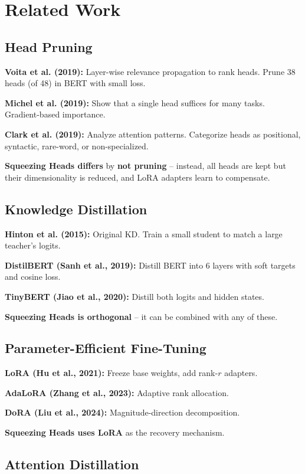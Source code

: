 
\section{Related Work}

\subsection{Head Pruning}

\textbf{Voita et al. (2019):} Layer-wise relevance propagation to rank heads. 
Prune 38 heads (of 48) in BERT with small loss.

\textbf{Michel et al. (2019):} Show that a single head suffices for many tasks. 
Gradient-based importance.

\textbf{Clark et al. (2019):} Analyze attention patterns. Categorize heads as 
positional, syntactic, rare-word, or non-specialized.

\textbf{Squeezing Heads differs} by \textbf{not pruning} -- instead, all heads are 
kept but their dimensionality is reduced, and LoRA adapters learn to 
compensate.

\subsection{Knowledge Distillation}

\textbf{Hinton et al. (2015):} Original KD. Train a small student to match a 
large teacher's logits.

\textbf{DistilBERT (Sanh et al., 2019):} Distill BERT into 6 layers with soft 
targets and cosine loss.

\textbf{TinyBERT (Jiao et al., 2020):} Distill both logits and hidden states.

\textbf{Squeezing Heads is orthogonal} -- it can be combined with any of these.

\subsection{Parameter-Efficient Fine-Tuning}

\textbf{LoRA (Hu et al., 2021):} Freeze base weights, add rank-$r$ adapters.

\textbf{AdaLoRA (Zhang et al., 2023):} Adaptive rank allocation.

\textbf{DoRA (Liu et al., 2024):} Magnitude-direction decomposition.

\textbf{Squeezing Heads uses LoRA} as the recovery mechanism.

\subsection{Attention Distillation}

